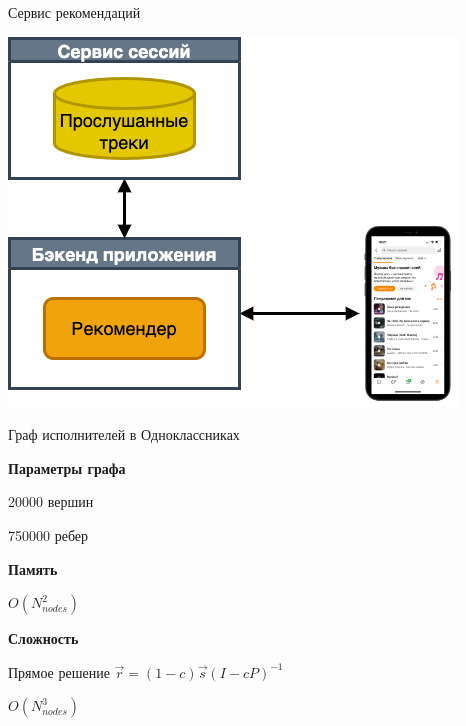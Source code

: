 \documentclass[11pt,aspectratio=169,handout]{beamer}
\begin{document}
\begin{frame}{Сервис рекомендаций}

\begin{center}
\includegraphics[scale=0.35]{images/backend.png}
\end{center}

\end{frame}

{
\begin{frame}[plain]{Граф исполнителей в Одноклассниках}

{\bf Параметры графа}

20000 вершин

750000 ребер 

\pause

\vfill

{\bf Память}

\pause

$O(N_{nodes}^2)$

\vfill

{\bf Сложность}

Прямое решение $\vec{r} = (1 - c) \vec{s} \left(I - c P \right)^{-1}$

\pause

$O(N_{nodes}^3)$

\end{frame}
}
\end{document}
